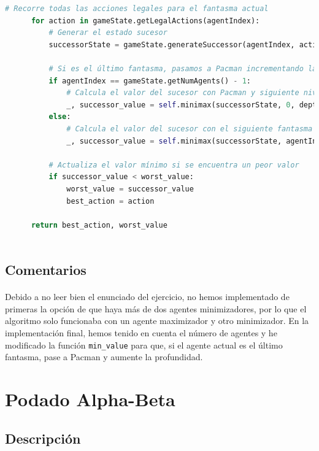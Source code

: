 \documentclass{report}
\begin{document}
\begin{lstlisting}[language=Python, caption=Implementación final del agente Minimax]
      # Recorre todas las acciones legales para el fantasma actual
      for action in gameState.getLegalActions(agentIndex):
          # Generar el estado sucesor
          successorState = gameState.generateSuccessor(agentIndex, action)
          
          # Si es el último fantasma, pasamos a Pacman incrementando la profundidad
          if agentIndex == gameState.getNumAgents() - 1:
              # Calcula el valor del sucesor con Pacman y siguiente nivel de profundidad
              _, successor_value = self.minimax(successorState, 0, depth + 1)
          else:
              # Calcula el valor del sucesor con el siguiente fantasma
              _, successor_value = self.minimax(successorState, agentIndex + 1, depth)

          # Actualiza el valor mínimo si se encuentra un peor valor
          if successor_value < worst_value:
              worst_value = successor_value
              best_action = action

      return best_action, worst_value
        
          \end{lstlisting}
        \subsection*{Comentarios}
          \paragraph*{}{
            Debido a no leer bien el enunciado del ejercicio, no hemos implementado de primeras la opción de que haya más de dos agentes minimizadores, por lo que el algoritmo solo funcionaba con un agente maximizador y otro minimizador.
            En la implementación final, hemos tenido en cuenta el número de agentes y he modificado la función \texttt{min\_value} para que, si el agente actual es el último fantasma, pase a Pacman y aumente la profundidad.
          }
      \clearpage\section{Podado Alpha-Beta} %
        \subsection*{Descripción}
\end{document}
